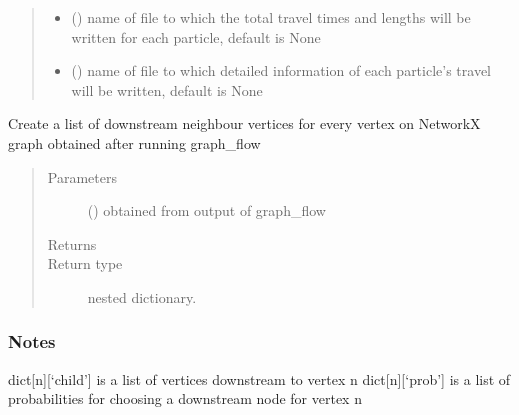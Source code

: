 \documentclass[letterpaper,10pt,english]{sphinxmanual}
\begin{document}
\begin{fulllineitems}
\begin{fulllineitems}
\begin{quote}
\begin{description}
\begin{itemize}
\item {} 
 () \textendash{} name of file to  which the total travel times and lengths will be written for each particle, default is None

\item {} 
 () \textendash{} name of file to which detailed information of each particle’s travel will be written, default is None

\end{itemize}

\end{description}\end{quote}

\end{fulllineitems}


\end{fulllineitems}


\begin{fulllineitems}
\label{\detokenize{pydfnworks:pydfnworks.dfnGraph.graph_transport.create_neighbour_list}}
Create a list of downstream neighbour vertices for every vertex on NetworkX graph obtained after running graph\_flow
\begin{quote}\begin{description}
\item[{Parameters}] \leavevmode
{} () \textendash{} obtained from output of graph\_flow

\item[{Returns}] \leavevmode
{}

\item[{Return type}] \leavevmode
nested dictionary.

\end{description}\end{quote}
\subsubsection*{Notes}

dict{[}n{]}{[}‘child’{]} is a list of vertices downstream to vertex n
dict{[}n{]}{[}‘prob’{]} is a list of probabilities for choosing a downstream node for vertex n

\end{fulllineitems}
\end{document}

